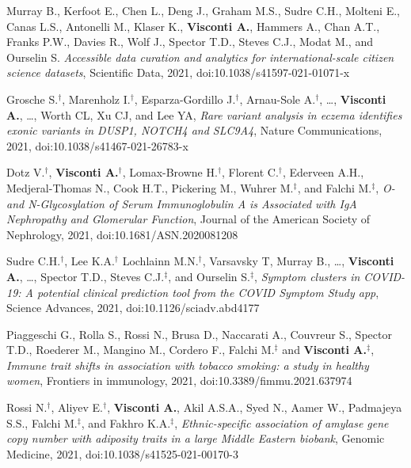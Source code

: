 {\begin{itemize}
		 Murray B., Kerfoot E., Chen L., Deng J., Graham M.S., Sudre C.H., Molteni E., Canas L.S., Antonelli M., Klaser K., \textbf{Visconti A.}, Hammers A., Chan A.T., Franks P.W., Davies R., Wolf J., Spector T.D., Steves C.J., Modat M., and Ourselin S. \emph{Accessible data curation and analytics for international-scale citizen science datasets}, Scientific Data, 2021, doi:10.1038/s41597-021-01071-x

	    Grosche S.$^{\textbf{$\dag $}}$, Marenholz I.$^{\textbf{$\dag $}}$, Esparza-Gordillo J.$^{\textbf{$\dag $}}$, Arnau-Sole A.$^{\textbf{$\dag $}}$, \dots, \textbf{Visconti A.}, \dots, Worth CL, Xu CJ, and Lee YA, \emph{Rare variant analysis in eczema identifies exonic variants in DUSP1, NOTCH4 and SLC9A4}, Nature Communications, 2021, doi:10.1038/s41467-021-26783-x

	    Dotz V.$^{\textbf{$\dag $}}$, \textbf{Visconti A.}$^{\textbf{$\dag $}}$, Lomax-Browne H.$^{\textbf{$\dag $}}$, Florent C.$^{\textbf{$\dag $}}$, Ederveen A.H., Medjeral-Thomas N., Cook H.T., Pickering M.,  Wuhrer M.$^{\textbf{$\ddag $}}$, and Falchi M.$^{\textbf{$\ddag $}}$, \emph{O- and N-Glycosylation of Serum Immunoglobulin A is Associated with IgA Nephropathy and Glomerular Function}, Journal of the American Society of Nephrology, 2021, doi:10.1681/ASN.2020081208

		 Sudre C.H.$^{\textbf{$\dag $}}$, Lee K.A.$^{\textbf{$\dag $}}$ Lochlainn M.N.$^{\textbf{$\dag $}}$, Varsavsky T, Murray B., \dots, \textbf{Visconti A.}, \dots, Spector T.D., Steves C.J.$^{\textbf{$\ddag $}}$, and Ourselin S.$^{\textbf{$\ddag $}}$, \emph{Symptom clusters in COVID-19: A potential clinical prediction tool from the COVID Symptom Study app}, Science Advances, 2021, doi:10.1126/sciadv.abd4177
				
		  Piaggeschi G., Rolla S., Rossi N., Brusa D., Naccarati A., Couvreur S., Spector T.D., Roederer M., Mangino M., Cordero F., Falchi M.$^{\textbf{$\ddag $}}$ and \textbf{Visconti A.}$^{\textbf{$\ddag $}}$, \emph{Immune trait shifts in association with tobacco smoking: a study in healthy women}, Frontiers in immunology, 2021, doi:10.3389/fimmu.2021.637974
		
	    Rossi N.$^{\textbf{$\dag $}}$, Aliyev E.$^{\textbf{$\dag $}}$, \textbf{Visconti A.}, Akil A.S.A., Syed N., Aamer W., Padmajeya S.S., Falchi M.$^{\textbf{$\ddag $}}$, and Fakhro K.A.$^{\textbf{$\ddag $}}$, \emph{Ethnic-specific association of amylase gene copy number with adiposity traits in a large Middle Eastern biobank}, Genomic Medicine, 2021, doi:10.1038/s41525-021-00170-3
		

\end{itemize}}
